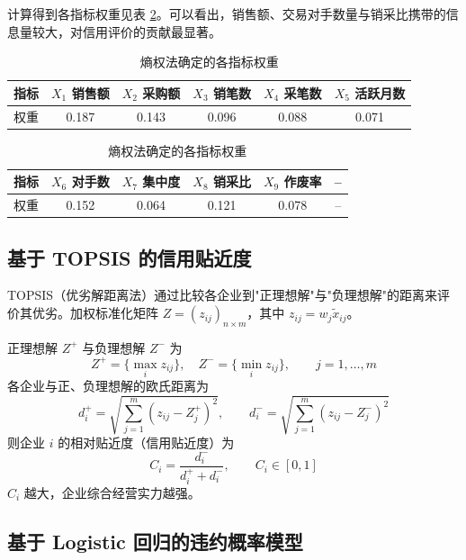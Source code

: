 \documentclass[12pt]{ctexart}
\begin{document}
计算得到各指标权重见表 \ref{tab:weight}。可以看出，销售额、交易对手数量与销采比携带的信息量较大，对信用评价的贡献最显著。

\begin{table}[H]
\centering
\caption{熵权法确定的各指标权重}
\label{tab:weight}
\small
\begin{tabular}{lccccc}
\toprule
\textbf{指标} & $X_1$ 销售额 & $X_2$ 采购额 & $X_3$ 销笔数 & $X_4$ 采笔数 & $X_5$ 活跃月数 \\
\midrule
权重 & 0.187 & 0.143 & 0.096 & 0.088 & 0.071 \\
\bottomrule
\end{tabular}

\vspace{0.6em}
\begin{tabular}{lccccc}
\toprule
\textbf{指标} & $X_6$ 对手数 & $X_7$ 集中度 & $X_8$ 销采比 & $X_9$ 作废率 & -- \\
\midrule
权重 & 0.152 & 0.064 & 0.121 & 0.078 & -- \\
\bottomrule
\end{tabular}
\end{table}

\subsection{基于 TOPSIS 的信用贴近度}

TOPSIS（优劣解距离法）通过比较各企业到"正理想解"与"负理想解"的距离来评价其优劣。加权标准化矩阵 $Z=(z_{ij})_{n\times m}$，其中 $z_{ij}=w_j\tilde{x}_{ij}$。

正理想解 $Z^{+}$ 与负理想解 $Z^{-}$ 为
\begin{equation}
Z^{+} = \{\max_i z_{ij}\},\quad Z^{-} = \{\min_i z_{ij}\},\qquad j=1,\dots,m
\end{equation}
各企业与正、负理想解的欧氏距离为
\begin{equation}
d_i^{+}=\sqrt{\sum_{j=1}^{m}(z_{ij}-Z^{+}_j)^{2}},\qquad
d_i^{-}=\sqrt{\sum_{j=1}^{m}(z_{ij}-Z^{-}_j)^{2}}
\end{equation}
则企业 $i$ 的相对贴近度（信用贴近度）为
\begin{equation}
C_i = \frac{d_i^{-}}{d_i^{+}+d_i^{-}},\qquad C_i\in[0,1]
\end{equation}
$C_i$ 越大，企业综合经营实力越强。

\subsection{基于 Logistic 回归的违约概率模型}
\end{document}
